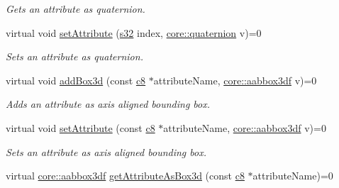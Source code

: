 \begin{DoxyCompactItemize}
\begin{DoxyCompactList}\small\item\em Gets an attribute as quaternion. \end{DoxyCompactList}\item 
\mbox{\label{classirr_1_1io_1_1IAttributes_ac727ca222d4604f04742f391c9e18008}} 
virtual void \hyperlink{classirr_1_1io_1_1IAttributes_ac727ca222d4604f04742f391c9e18008}{set\+Attribute} (\hyperlink{namespaceirr_ac66849b7a6ed16e30ebede579f9b47c6}{s32} index, \hyperlink{classirr_1_1core_1_1quaternion}{core\+::quaternion} v)=0
\begin{DoxyCompactList}\small\item\em Sets an attribute as quaternion. \end{DoxyCompactList}\item 
\mbox{\label{classirr_1_1io_1_1IAttributes_adb9f747bf01137075e8e30f0d75cb56c}} 
virtual void \hyperlink{classirr_1_1io_1_1IAttributes_adb9f747bf01137075e8e30f0d75cb56c}{add\+Box3d} (const \hyperlink{namespaceirr_a9395eaea339bcb546b319e9c96bf7410}{c8} $\ast$attribute\+Name, \hyperlink{namespaceirr_1_1core_a60f4b4c744aba55f10530d503c6ecb04}{core\+::aabbox3df} v)=0
\begin{DoxyCompactList}\small\item\em Adds an attribute as axis aligned bounding box. \end{DoxyCompactList}\item 
\mbox{\label{classirr_1_1io_1_1IAttributes_a1b876bafce99d3401c2157c0a01dd9f6}} 
virtual void \hyperlink{classirr_1_1io_1_1IAttributes_a1b876bafce99d3401c2157c0a01dd9f6}{set\+Attribute} (const \hyperlink{namespaceirr_a9395eaea339bcb546b319e9c96bf7410}{c8} $\ast$attribute\+Name, \hyperlink{namespaceirr_1_1core_a60f4b4c744aba55f10530d503c6ecb04}{core\+::aabbox3df} v)=0
\begin{DoxyCompactList}\small\item\em Sets an attribute as axis aligned bounding box. \end{DoxyCompactList}\item 
virtual \hyperlink{namespaceirr_1_1core_a60f4b4c744aba55f10530d503c6ecb04}{core\+::aabbox3df} \hyperlink{classirr_1_1io_1_1IAttributes_a215218b9b1ebb8313557b44bb3bce363}{get\+Attribute\+As\+Box3d} (const \hyperlink{namespaceirr_a9395eaea339bcb546b319e9c96bf7410}{c8} $\ast$attribute\+Name)=0

\end{DoxyCompactItemize}
